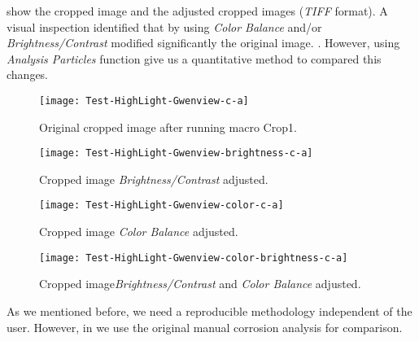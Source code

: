 \documentclass[10pt, fleqn]{article}    %
\begin{document}
	 show the cropped image and the adjusted cropped images (\textit{TIFF} format). A visual inspection identified that by using \textit{Color Balance} and/or \textit{Brightness/Contrast} modified significantly the original image.  . However, using \textit{Analysis Particles} function give us a quantitative method to compared this changes. 
	
	\begin{figure}[H]
		\centering
		\texttt{[image: Test-HighLight-Gwenview-c-a]} 
		\caption{Original cropped image after running macro Crop1.}
		\label{fig:Cropped}
	\end{figure}
	
	
	
	\begin{figure}[H]
		\centering
		\texttt{[image: Test-HighLight-Gwenview-brightness-c-a]} 
		\caption{Cropped image \textit{Brightness/Contrast} adjusted.}
		\label{fig:Cropped-brightness}
	\end{figure}
	
	
	\begin{figure}[H]
		\centering
		\texttt{[image: Test-HighLight-Gwenview-color-c-a]} 
		\caption{Cropped image \textit{Color Balance} adjusted.}
		\label{fig:Cropped-color}
	\end{figure}

	\begin{figure}[H]
		\centering
		\texttt{[image: Test-HighLight-Gwenview-color-brightness-c-a]} 
		\caption{Cropped image\textit{Brightness/Contrast} and \textit{Color Balance} adjusted.}
		\label{fig:Cropped-brightness-color}
	\end{figure}



 As we mentioned before, we need a reproducible methodology independent of the user. However, in  we use the original manual corrosion analysis for comparison. 
\end{document}
